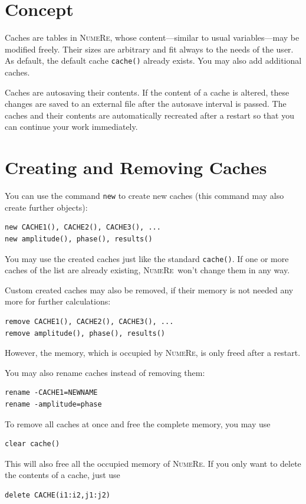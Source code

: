 \documentclass[DIV=14,headsepline,footsepline]{scrbook}
\newcommand{\NR}{\textsc{Nu\-me\-Re}}
\begin{document}
			\section{Concept}
				Caches are tables in \NR, whose content---similar to usual variables---may be modified freely. Their sizes are arbitrary and fit always to the needs of the user. As default, the default cache \verb+cache()+ already exists. You may also add additional caches.
				
				Caches are autosaving their contents. If the content of a cache is altered, these changes are saved to an external file after the autosave interval is passed. The caches and their contents are automatically recreated after a restart so that you can continue your work immediately.
			\section{Creating and Removing Caches}
				You can use the command \verb+new+ to create new caches (this command may also create further objects):
				\begin{lstlisting}
new CACHE1(), CACHE2(), CACHE3(), ...
new amplitude(), phase(), results()
				\end{lstlisting}
				You may use the created caches just like the standard \verb+cache()+. If one or more caches of the list are already existing, \NR\ won't change them in any way.
				
				Custom created caches may also be removed, if their memory is not needed any more for further calculations:
				\begin{lstlisting}
remove CACHE1(), CACHE2(), CACHE3(), ...
remove amplitude(), phase(), results()
				\end{lstlisting}
				However, the memory, which is occupied by \NR, is only freed after a restart.
				
				You may also rename caches instead of removing them:
				\begin{lstlisting}
rename -CACHE1=NEWNAME
rename -amplitude=phase
				\end{lstlisting}
				
				To remove all caches at once and free the complete memory, you may use 
				\begin{lstlisting}
clear cache()
				\end{lstlisting}
				This will also free all the occupied memory of \NR. If you only want to delete the contents of a cache, just use 
				\begin{lstlisting}
delete CACHE(i1:i2,j1:j2)
				\end{lstlisting}
				
\end{document}
